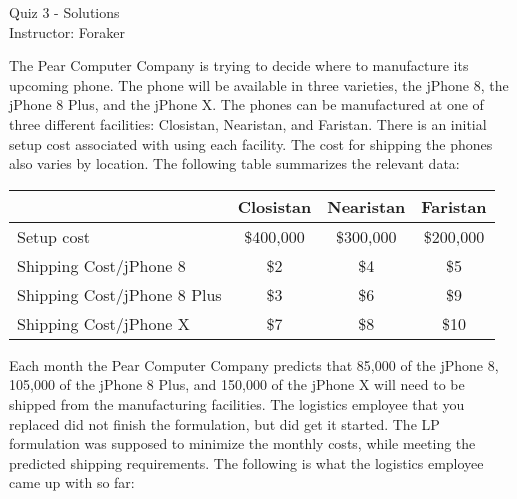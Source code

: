 \documentclass[10pt]{article}
\begin{document}
\begin{center}
  {\sc Quiz 3 - Solutions}\\
  {\sc Instructor: Foraker}
\end{center}

The Pear Computer Company is trying to decide where to manufacture its upcoming phone.  The phone will be available in three varieties, the jPhone 8, the jPhone 8 Plus, and the jPhone X.  The phones can be manufactured at one of three different facilities:  Closistan, Nearistan, and Faristan.  There is an initial setup cost associated with using each facility.  The cost for shipping the phones also varies by location.  The following table summarizes the relevant data:

\begin{center}
\begin{tabular}{l|c|c|c}
   & Closistan  & Nearistan & Faristan \\
  \hline 
  Setup cost & \$400,000 & \$300,000 & \$200,000 \\
  \hline 
  Shipping Cost/jPhone 8 & \$2 & \$4 & \$5 \\
  \hline
  Shipping Cost/jPhone 8 Plus & \$3 & \$6 & \$9 \\
  \hline
  Shipping Cost/jPhone X & \$7 & \$8 & \$10 \\
  \hline
\end{tabular}
\end{center}

Each month the Pear Computer Company predicts that 85,000 of the jPhone 8, 105,000 of the jPhone 8 Plus, and 150,000 of the jPhone X will need to be shipped from the manufacturing facilities.  The logistics employee that you replaced did not finish the formulation, but did get it started.  The LP formulation was supposed to minimize the monthly costs, while meeting the predicted shipping requirements. The following is what the logistics employee came up with so far:
\end{document}
